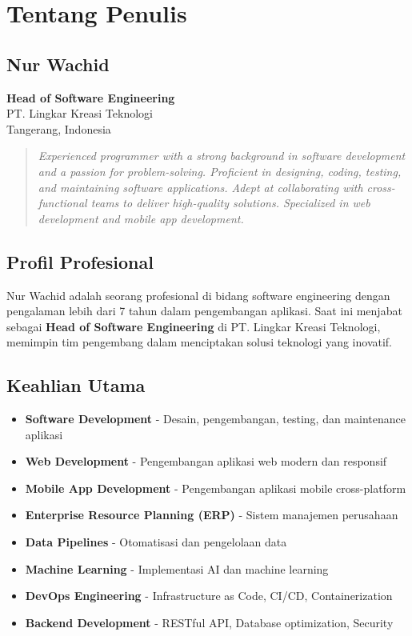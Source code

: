 \section*{Tentang Penulis}

\subsection*{Nur Wachid}

\textbf{Head of Software Engineering} \\
PT. Lingkar Kreasi Teknologi \\
Tangerang, Indonesia

\vspace{0.5cm}

\begin{quote}
\textit{Experienced programmer with a strong background in software development and a passion for problem-solving. Proficient in designing, coding, testing, and maintaining software applications. Adept at collaborating with cross-functional teams to deliver high-quality solutions. Specialized in web development and mobile app development.}
\end{quote}

\subsection*{Profil Profesional}

Nur Wachid adalah seorang profesional di bidang software engineering dengan pengalaman lebih dari 7 tahun dalam pengembangan aplikasi. Saat ini menjabat sebagai \textbf{Head of Software Engineering} di PT. Lingkar Kreasi Teknologi, memimpin tim pengembang dalam menciptakan solusi teknologi yang inovatif.

\subsection*{Keahlian Utama}

\begin{itemize}
\item \textbf{Software Development} - Desain, pengembangan, testing, dan maintenance aplikasi
\item \textbf{Web Development} - Pengembangan aplikasi web modern dan responsif
\item \textbf{Mobile App Development} - Pengembangan aplikasi mobile cross-platform
\item \textbf{Enterprise Resource Planning (ERP)} - Sistem manajemen perusahaan
\item \textbf{Data Pipelines} - Otomatisasi dan pengelolaan data
\item \textbf{Machine Learning} - Implementasi AI dan machine learning
\item \textbf{DevOps Engineering} - Infrastructure as Code, CI/CD, Containerization
\item \textbf{Backend Development} - RESTful API, Database optimization, Security
\end{itemize}

